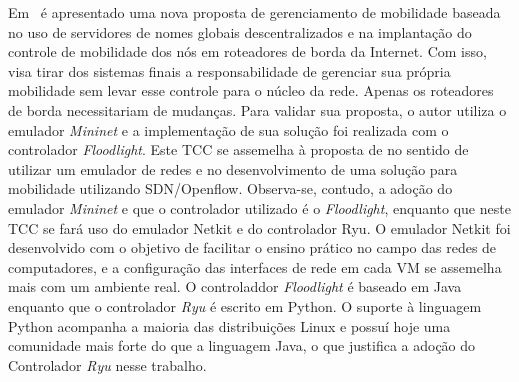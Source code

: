 \documentclass[	12pt, Times, openright, twoside, a4paper, english, brazil]{abntex2}
\begin{document}

Em~\cite{almeida2016} é apresentado uma nova proposta de gerenciamento de mobilidade baseada no uso de servidores de nomes globais descentralizados e na implantação do controle de mobilidade dos nós em roteadores de borda da Internet. Com isso,  visa tirar dos sistemas finais a responsabilidade de gerenciar sua própria mobilidade sem levar esse controle para o núcleo da rede. Apenas os roteadores de borda necessitariam de mudanças. Para validar sua proposta, o autor utiliza o emulador \textit{Mininet} e a implementação de sua solução foi realizada com o controlador \textit{Floodlight}. Este TCC se assemelha à proposta de  no sentido de utilizar um emulador de redes e no desenvolvimento de uma solução para mobilidade utilizando SDN/Openflow. Observa-se, contudo, a adoção do emulador \textit{Mininet} e que o controlador utilizado é o \textit{Floodlight}, enquanto que neste TCC se fará uso do emulador Netkit e do controlador Ryu. O emulador Netkit foi desenvolvido com o objetivo de facilitar o ensino prático no campo das redes de computadores, e a configuração das interfaces de rede em cada VM se assemelha mais com um ambiente real. O controladdor \textit{Floodlight} é baseado em Java enquanto que o controlador \textit{Ryu} é escrito em Python. O suporte à linguagem Python acompanha a maioria das distribuições Linux e possuí hoje uma comunidade mais forte do que a linguagem Java, o que justifica a adoção do Controlador \textit{Ryu} nesse trabalho.
\end{document}
